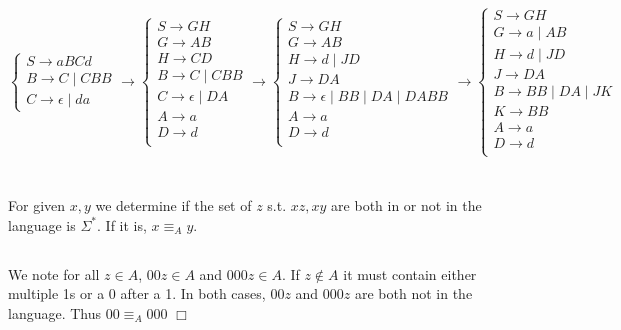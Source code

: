 \documentclass{article}
\begin{document}
\section{}
\begin{equation*}
\begin{cases}
S \to aBCd\\
B \to C \;|\; CBB\\
C \to \epsilon \;|\; da
\end{cases}
\to
\begin{cases}
S \to GH\\
G \to AB\\
H \to CD\\
B \to C \;|\; CBB\\
C \to \epsilon \;|\; DA\\
A \to a\\
D \to d\\
\end{cases}
\to
\begin{cases}
S \to GH\\
G \to AB\\
H \to d \;|\; JD\\
J \to DA\\
B \to \epsilon \;|\; BB \;|\; DA \;|\; DABB\\
A \to a\\
D \to d\\
\end{cases}
\to
\begin{cases}
S \to GH\\
G \to a \;|\; AB\\
H \to d \;|\; JD\\
J \to DA\\
B \to BB \;|\; DA \;|\; JK\\
K \to BB\\
A \to a\\
D \to d\\
\end{cases}
\end{equation*}

\section{}
For given $x,y$ we determine if the set of $z$ s.t. $xz,xy$ are both in or not in the language is $\Sigma^*$. If it is, $x \equiv_A y$.
\subsection{}
We note for all $z \in A$, $00z \in A$ and $000z \in A$. If $z \notin A$ it must contain either multiple 1s or a 0 after a 1. In both cases, $00z$ and $000z$ are both not in the language. Thus $00 \equiv_A 000$ $\Box$
\end{document}

